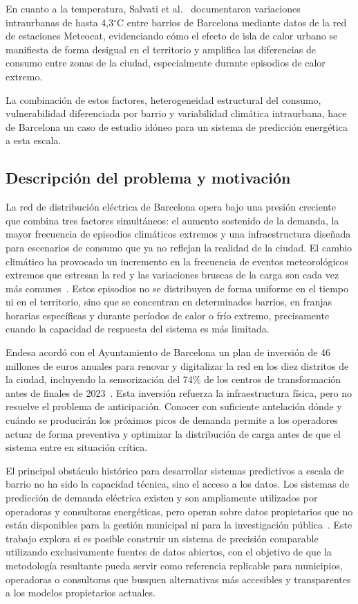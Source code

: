 \documentclass[12pt, a4paper]{article}
\begin{document}
En cuanto a la temperatura, Salvati et al.~\cite{salvati2017} documentaron variaciones intraurbanas de hasta 4,3$^\circ$C entre barrios de Barcelona mediante datos de la red de estaciones Meteocat, evidenciando cómo el efecto de isla de calor urbano se manifiesta de forma desigual en el territorio y amplifica las diferencias de consumo entre zonas de la ciudad, especialmente durante episodios de calor extremo.

La combinación de estos factores, heterogeneidad estructural del consumo, vulnerabilidad diferenciada por barrio y variabilidad climática intraurbana, hace de Barcelona un caso de estudio idóneo para un sistema de predicción energética a esta escala.

\subsection{Descripción del problema y motivación}

La red de distribución eléctrica de Barcelona opera bajo una presión creciente que combina tres factores simultáneos: el aumento sostenido de la demanda, la mayor frecuencia de episodios climáticos extremos y una infraestructura diseñada para escenarios de consumo que ya no reflejan la realidad de la ciudad. El cambio climático ha provocado un incremento en la frecuencia de eventos meteorológicos extremos que estresan la red y las variaciones bruscas de la carga son cada vez más comunes~\cite{moreno2022}. Estos episodios no se distribuyen de forma uniforme en el tiempo ni en el territorio, sino que se concentran en determinados barrios, en franjas horarias específicas y durante períodos de calor o frío extremo, precisamente cuando la capacidad de respuesta del sistema es más limitada.

Endesa acordó con el Ayuntamiento de Barcelona un plan de inversión de 46 millones de euros anuales para renovar y digitalizar la red en los diez distritos de la ciudad, incluyendo la sensorización del 74\% de los centros de transformación antes de finales de 2023~\cite{endesa2021}. Esta inversión refuerza la infraestructura física, pero no resuelve el problema de anticipación. Conocer con suficiente antelación dónde y cuándo se producirán los próximos picos de demanda permite a los operadores actuar de forma preventiva y optimizar la distribución de carga antes de que el sistema entre en situación crítica.

El principal obstáculo histórico para desarrollar sistemas predictivos a escala de barrio no ha sido la capacidad técnica, sino el acceso a los datos. Los sistemas de predicción de demanda eléctrica existen y son ampliamente utilizados por operadoras y consultoras energéticas, pero operan sobre datos propietarios que no están disponibles para la gestión municipal ni para la investigación pública~\cite{jiang2024}. Este trabajo explora si es posible construir un sistema de precisión comparable utilizando exclusivamente fuentes de datos abiertos, con el objetivo de que la metodología resultante pueda servir como referencia replicable para municipios, operadoras o consultoras que busquen alternativas más accesibles y transparentes a los modelos propietarios actuales.
\end{document}
